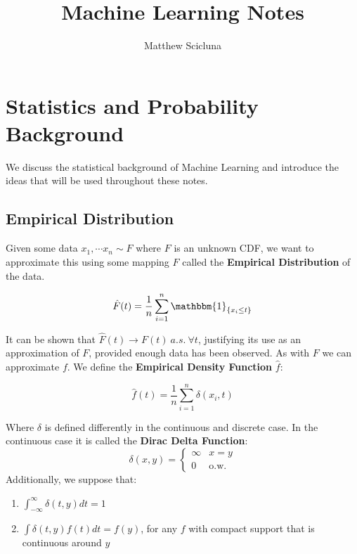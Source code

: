 \documentclass[]{article}
\theoremstyle{mattstyle}
\theoremstyle{definition}
\begin{document}
\title{Machine Learning Notes}
\author{Matthew Scicluna}
\maketitle

\newpage

\tableofcontents

\newpage

\section{Statistics and Probability Background}

We discuss the statistical background of Machine Learning and introduce the ideas that will be used throughout these notes.

\subsection{Empirical Distribution}

Given some data \(x_1, \cdots x_n \sim F\) where $F$ is an unknown CDF, we want to approximate this using some mapping $\hat{F}$ called the \textbf{Empirical Distribution} of the data.

\begin{equation}
	\hat{F}(t) = \frac{1}{n}\sum_{i=1}^n \mathbbm{1}_{\{x_i \le t\}}
\end{equation} 

It can be shown that $\hat{F}(t) \rightarrow F(t) \ a.s.\ \forall t$, justifying its use as an approximation of $F$, provided enough data has been observed. As with $F$ we can approximate $f$. We define the \textbf{Empirical Density Function} $\hat{f}$:

\begin{equation}
	\hat{f}(t) = \frac{1}{n}\sum_{i=1}^n \delta(x_i, t)
\end{equation}

Where $\delta$ is defined differently in the continuous and discrete case. In the continuous case it is called the \textbf{Dirac Delta Function}:
	\begin{equation}
		\delta(x,y) = \begin{cases}
		\infty & x=y \\
		0 & \text{o.w.}
	\end{cases}
	\end{equation}
	Additionally, we suppose that:
	\begin{enumerate}
		\item $\int_{-\infty}^{\infty} \delta(t,y)dt = 1$
		\item $\int \delta(t,y) f(t) dt = f(y)$, for any $f$ with compact support that is continuous around $y$
	\end{enumerate}
\end{document}
